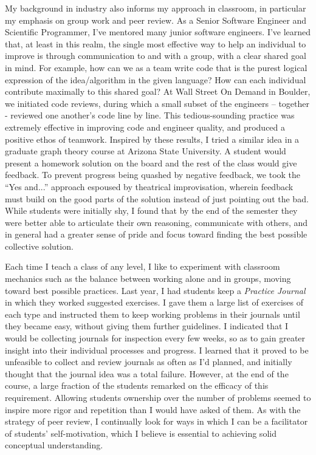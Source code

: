 \documentclass[12pt]{article}
\begin{document}
My background in industry also informs my approach in classroom, in particular my emphasis on group work and peer review. As a Senior Software Engineer and Scientific Programmer,
I've mentored many junior software engineers. I've learned that, at least in this realm, the single most effective way to help an individual to improve is through communication to 
and with a group, with a clear shared goal in mind. For example, how can we as a team write code that is the purest logical expression of the idea/algorithm in the given language? 
How can each individual contribute maximally to this shared goal? At Wall Street On Demand in Boulder, we initiated code reviews, during which a small subset of the 
engineers – together - reviewed one another’s code line by line. This tedious-sounding practice was extremely effective in improving code and engineer quality, 
and produced a positive ethos of teamwork. Inspired by these results, I tried a similar idea in a graduate graph theory course at Arizona State University. 
A student would present a homework solution on the board and the rest of the class would give feedback. To prevent progress being quashed by negative feedback, 
we took the ``Yes and...'' approach espoused by theatrical improvisation, wherein feedback must build on the
good parts of the solution instead of just pointing out the bad. While students were initially shy, I found that by the end of the semester they were better 
able to articulate their own reasoning, communicate with others, and in general had a greater sense of pride and focus toward finding the best possible collective solution. 

Each time I teach a class of any level, I like to experiment with classroom mechanics such as the balance between working alone and in groups, moving toward 
best possible practices. Last year, I had students keep a \emph{Practice Journal} in which they worked suggested exercises. I gave them a large list of exercises of 
each type and instructed them to keep working problems in their journals until they became easy, without giving them further guidelines. I indicated that I would 
be collecting journals for inspection every few weeks, so as to gain greater insight into their individual processes and progress. I learned that it proved to be 
unfeasible to collect and review journals as often as I'd planned, and initially thought that the journal idea was a total failure. However, at the end of the course, 
a large fraction of the students remarked on the efficacy of this requirement.  Allowing students ownership over the number of problems seemed to inspire more rigor and 
repetition than I would have asked of them. As with the strategy of peer review, I continually look for ways in which I can be a facilitator of students' self-motivation, 
which I believe is essential to achieving solid conceptual understanding. 
\end{document}
